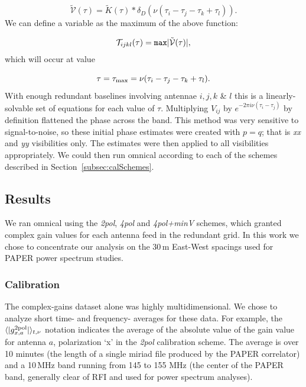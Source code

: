 \begin{equation}
\tilde{\mathcal{V}}(\tau) = \tilde{K}(\tau)*\delta_D\left(\nu (\tau_i - \tau_j - \tau_k + \tau_l)\right).
\end{equation}
We can define a variable as the maximum of the above function:

\begin{equation}
\mathcal{T}_{ijkl}(\tau) = {\tt max} | \tilde{\mathcal{V}}(\tau) |,
\end{equation}
which will occur at value 

\begin{equation}
\tau = \tau_{\rm max} = \nu (\tau_i - \tau_j - \tau_k + \tau_l).
\end{equation}
With enough redundant baselines involving antennae $i,j,k$ \& $l$ this is a linearly-solvable set of equations for each value of $\tau$. Multiplying $V_{ij}$ by $e^{-2\pi i \nu (\tau_i - \tau_j)}$ by definition flattened the phase across the band. This method was very sensitive to signal-to-noise, so these initial phase estimates were created with $p=q$; that is \textit{xx} and \textit{yy} visibilities only. The estimates were then applied to all visibilities appropriately. We could then run {\sc omnical} according to each of the schemes described in Section~\ref{subsec:calSchemes}.

\subsection{Results}
\label{sec:polcal_results}

We ran {\sc omnical} using the \textit{2pol}, \textit{4pol} and \textit{4pol+minV} schemes, which granted complex gain values for each antenna feed in the redundant grid. In this work we chose to concentrate our analysis on the 30\,m East-West spacings used for PAPER power spectrum studies.

\subsubsection{Calibration}

The complex-gains dataset alone was highly multidimensional. We chose to analyze short time- and frequency- averages for these data. For example, the $\langle | g^{\rm 2pol}_{x,a} | \rangle_{t,\nu}$ notation indicates the average of the absolute value of the gain value for antenna $a$, polarization `x' in the \textit{2pol} calibration scheme. The average is over 10 minutes (the length of a single {\sc miriad} file produced by the PAPER correlator) and a 10\,MHz band running from 145 to 155 MHz (the center of the PAPER band, generally clear of RFI and used for power spectrum analyses).

